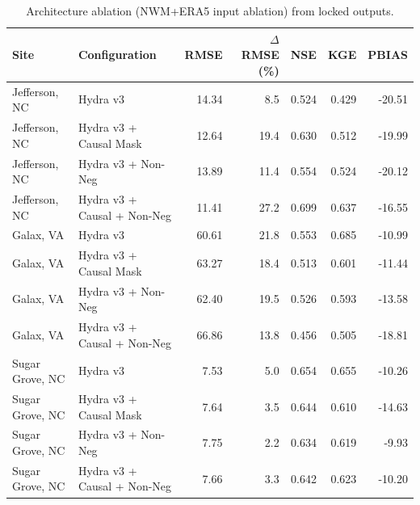 \begin{table}
\centering
\caption{Architecture ablation (NWM+ERA5 input ablation) from locked outputs.}
\small
\begin{tabular}{ll r r r r r}
\toprule
\textbf{Site} & \textbf{Configuration} & \textbf{RMSE} & \textbf{$\Delta$RMSE (\%)} & \textbf{NSE} & \textbf{KGE} & \textbf{PBIAS} \\
\midrule
Jefferson, NC & Hydra v3 & 14.34 & 8.5 & 0.524 & 0.429 & -20.51 \\
Jefferson, NC & Hydra v3 + Causal Mask & 12.64 & 19.4 & 0.630 & 0.512 & -19.99 \\
Jefferson, NC & Hydra v3 + Non-Neg & 13.89 & 11.4 & 0.554 & 0.524 & -20.12 \\
Jefferson, NC & Hydra v3 + Causal + Non-Neg & 11.41 & 27.2 & 0.699 & 0.637 & -16.55 \\
Galax, VA & Hydra v3 & 60.61 & 21.8 & 0.553 & 0.685 & -10.99 \\
Galax, VA & Hydra v3 + Causal Mask & 63.27 & 18.4 & 0.513 & 0.601 & -11.44 \\
Galax, VA & Hydra v3 + Non-Neg & 62.40 & 19.5 & 0.526 & 0.593 & -13.58 \\
Galax, VA & Hydra v3 + Causal + Non-Neg & 66.86 & 13.8 & 0.456 & 0.505 & -18.81 \\
Sugar Grove, NC & Hydra v3 & 7.53 & 5.0 & 0.654 & 0.655 & -10.26 \\
Sugar Grove, NC & Hydra v3 + Causal Mask & 7.64 & 3.5 & 0.644 & 0.610 & -14.63 \\
Sugar Grove, NC & Hydra v3 + Non-Neg & 7.75 & 2.2 & 0.634 & 0.619 & -9.93 \\
Sugar Grove, NC & Hydra v3 + Causal + Non-Neg & 7.66 & 3.3 & 0.642 & 0.623 & -10.20 \\
\bottomrule
\end{tabular}
\label{tab:ablation_arch}
\end{table}
